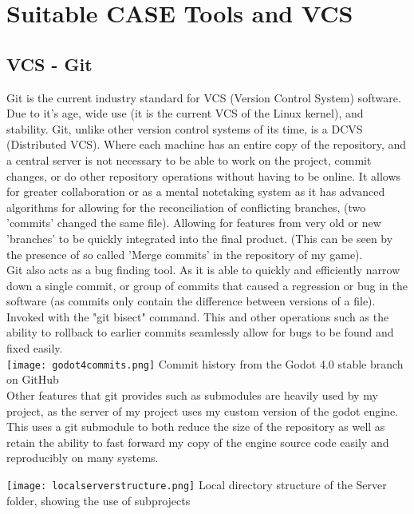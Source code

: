 \documentclass[12pt, DIV=calc]{scrartcl}
\begin{document}
\clearpage
\section{Suitable CASE Tools and VCS}
\subsection{VCS - Git}
Git is the current industry standard for VCS (Version Control System) software. Due to it's age, wide use (it is the current VCS of the Linux kernel), and stability. Git, unlike other version control systems of its time, is a DCVS (Distributed VCS). Where each machine has an entire copy of the repository, and a central server is not necessary to be able to work on the project, commit changes, or do other repository operations without having to be online. It allows for greater collaboration or as a mental notetaking system as it has advanced algorithms for allowing for the reconciliation of conflicting branches, (two 'commits' changed the same file). Allowing for features from very old or new 'branches' to be quickly integrated into the final product. (This can be seen by the presence of so called 'Merge commits' in the repository of my game). \\

Git also acts as a bug finding tool. As it is able to quickly and efficiently narrow down a single commit, or group of commits that caused a regression or bug in the software (as commits only contain the difference between versions of a file). Invoked with the "git bisect" command. This and other operations such as the ability to rollback to earlier commits seamlessly allow for bugs to be found and fixed easily.\\

\texttt{[image: godot4commits.png]}
Commit history from the Godot 4.0 stable branch on GitHub\\

Other features that git provides such as submodules are heavily used by my project, as the server of my project uses my custom version of the godot engine. This uses a git submodule to both reduce the size of the repository as well as retain the ability to fast forward my copy of the engine source code easily and reproducibly on many systems.

\texttt{[image: localserverstructure.png]}
Local directory structure of the Server folder, showing the use of subprojects\\
\end{document}
